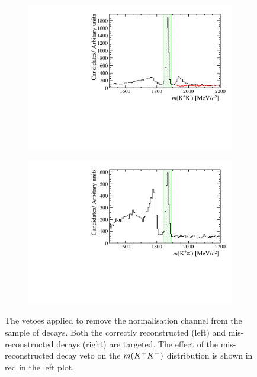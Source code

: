 \begin{figure}[!h]
   \centering
   \begin{subfigure}[t]{0.49\textwidth}
      \centering
      \includegraphics[width=1.0\textwidth]{figs/Selection/D0Veto_Comparison_B2DsKK_Ds2KKPi_Phi_M.pdf}
      \caption{\decay{\Dzb}{\Kp\Km} }
      \label{fig:normalisationveto_KK}
   \end{subfigure}
   \begin{subfigure}[t]{0.49\textwidth}
      \centering
      \includegraphics[width=1.0\textwidth]{figs/Selection/D0Veto_Comparison_B2DsKK_Ds2KKPi_Phi_KPi_M.pdf}
      \caption{\decay{\Dzb}{\Kp\pim} }
      \label{fig:normalisationveto_KPi}
   \end{subfigure}
   \caption{The vetoes applied to remove the normalisation channel \decay{\Bp}{\Dsp\Dzb} from the sample of \decay{\Bp}{\Dsp\Kp\Km} decays. Both the correctly reconstructed \decay{\Dzb}{\Kp\Km} (left) and mis-reconstructed \decay{\Dzb}{\Kp\pim} decays (right) are targeted. The effect of the mis-reconstructed \decay{\Dzb}{\Kp\pim} decay veto on the $m({{K}^+}{{K}^-})$ distribution is shown in red in the left plot.}
   \label{fig:normalisationveto}   
\end{figure}


